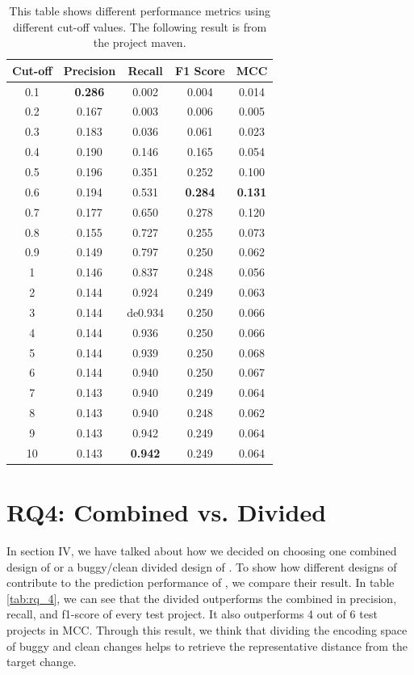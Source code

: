 \begin{table}[!ht]
\centering
\caption{This table shows different performance metrics using different cut-off values.
The following result is from the project maven. }
\begin{tabular}{|c|c|c|c|c|}
\hline
Cut-off & \multicolumn{1}{c|}{Precision} & \multicolumn{1}{c|}{Recall} & \multicolumn{1}{c|}{F1 Score} & \multicolumn{1}{c|}{MCC} \\ \hline
0.1 & \textbf{0.286} & 0.002 & 0.004 & 0.014 \\ \hline
0.2 & 0.167 & 0.003 & 0.006 & 0.005 \\ \hline
0.3 & 0.183 & 0.036 & 0.061 & 0.023 \\ \hline
0.4 & 0.190 & 0.146 & 0.165 & 0.054 \\ \hline
0.5 & 0.196 & 0.351 & 0.252 & 0.100 \\ \hline
0.6 & 0.194 & 0.531 & \textbf{0.284} & \textbf{0.131} \\ \hline
0.7 & 0.177 & 0.650 & 0.278 & 0.120 \\ \hline
0.8 & 0.155 & 0.727 & 0.255 & 0.073 \\ \hline
0.9 & 0.149 & 0.797 & 0.250 & 0.062 \\ \hline
1 & 0.146 & 0.837 & 0.248 & 0.056 \\ \hline
2 & 0.144 & 0.924 & 0.249 & 0.063 \\ \hline
3 & 0.144 & de0.934 & 0.250 & 0.066 \\ \hline
4 & 0.144 & 0.936 & 0.250 & 0.066 \\ \hline
5 & 0.144 & 0.939 & 0.250 & 0.068 \\ \hline
6 & 0.144 & 0.940 & 0.250 & 0.067 \\ \hline
7 & 0.143 & 0.940 & 0.249 & 0.064 \\ \hline
8 & 0.143 & 0.940 & 0.248 & 0.062 \\ \hline
9 & 0.143 & 0.942 & 0.249 & 0.064 \\ \hline
10 & 0.143 & \textbf{0.942} & 0.249 & 0.064 \\ \hline
\end{tabular}%
\label{tab:rq_3}
\end{table}


\section{RQ4: Combined {\simfin} vs. Divided {\simfin}}
In section IV, we have talked about how we decided on choosing one combined design of {\simfin} or a buggy/clean divided design of {\simfin}.
To show how different designs of {\simfin} contribute to the prediction performance of {\simfinmo}, we compare their result.
In table \ref{tab:rq_4}, we can see that the divided {\simfin} outperforms the combined {\simfin} in precision, recall, and f1-score of every test project.
It also outperforms 4 out of 6 test projects in MCC.
Through this result, we think that dividing the encoding space of buggy and clean changes helps to retrieve the representative distance from the target change.

